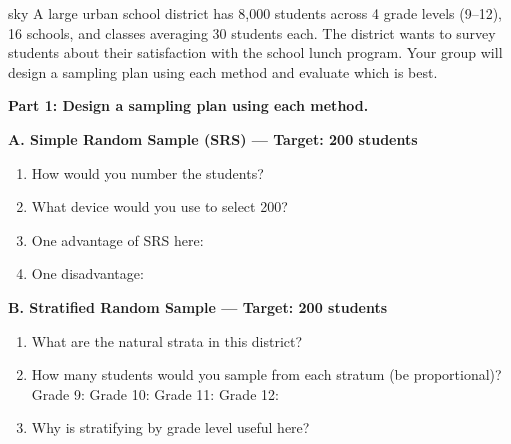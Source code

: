 \documentclass[10pt]{article}
\begin{document}
\namepartnerperiod

\vspace{0.1in}

\begin{scenariobox}[Context]{sky}
\small
A large urban school district has 8{,}000 students across 4 grade levels (9--12),
16 schools, and classes averaging 30 students each. The district wants to survey
students about their satisfaction with the school lunch program.
Your group will design a sampling plan using each method and evaluate which is best.
\end{scenariobox}

\vspace{0.1in}

\textbf{Part 1: Design a sampling plan using each method.}

\begin{practicebox}
\small
\textbf{A. Simple Random Sample (SRS) --- Target: 200 students}

\begin{enumerate}[leftmargin=1.5em, itemsep=6pt]
  \item How would you number the students? 
  \item What device would you use to select 200? 
  \item One advantage of SRS here: 
  \item One disadvantage: 
\end{enumerate}
\end{practicebox}

\vspace{0.1in}

\begin{practicebox}
\small
\textbf{B. Stratified Random Sample --- Target: 200 students}

\begin{enumerate}[leftmargin=1.5em, itemsep=6pt]
  \item What are the natural strata in this district? 
  \item How many students would you sample from each stratum (be proportional)?\\
        Grade 9:  \quad Grade 10:  \quad Grade 11: 
        \quad Grade 12: 
  \item Why is stratifying by grade level useful here?\\
        \\[1pt]
\end{enumerate}
\end{practicebox}
\end{document}
